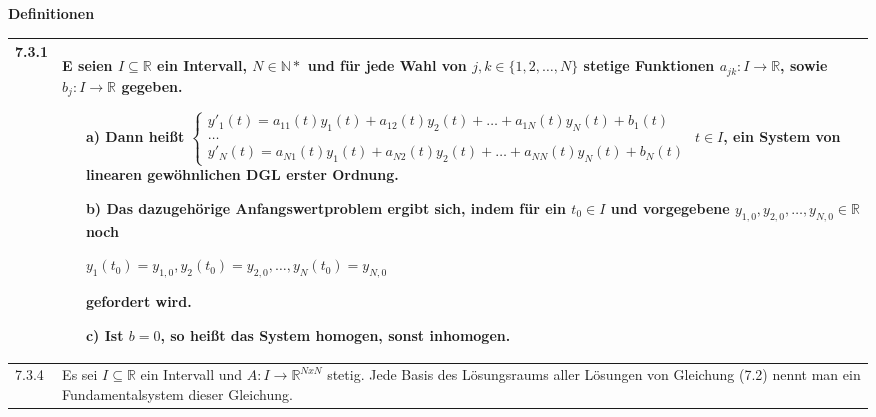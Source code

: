     \noindent
    \textbf{Definitionen}
    \begin{table}[H]  
    \begin{tabularx}{\textwidth}{X m{16cm}}
        \toprule

        7.3.1 & E seien $I \subseteq  \mathbb{R}$ ein Intervall, $N \in \mathbb{N*}$ und für jede Wahl von $j,k \in \{1,2,\dots,N\}$ 
            stetige Funktionen $a_{jk}: I \rightarrow \mathbb{R}$, sowie $b_j: I \rightarrow \mathbb{R}$ gegeben. 
            \begin{itemize}[topsep=-0.5cm]
                \item[a)] Dann heißt \hfill \break
                            $\begin{cases}
                                y'_1(t) = a_{11}(t)y_1(t) + a_{12}(t)y_2(t) + \dots + a_{1N}(t)y_N(t) + b_1(t) \\
                                \dots \\
                                y'_N(t) = a_{N1}(t)y_1(t) + a_{N2}(t) y_2(t) + \dots + a_{NN}(t)y_N(t) + b_N(t)
                            \end{cases}$
                            $t\in I$, ein \textbf{System von linearen gewöhnlichen DGL erster Ordnung.}
                \item[b)] Das dazugehörige Anfangswertproblem ergibt sich, indem für ein $t_0 \in I$ und vorgegebene
                            $y_{1,0},y_{2,0},\dots,y_{N,0} \in \mathbb{R}$ noch \hfill \break
                            \centerline{$ y_1(t_0) = y_{1,0}, y_2(t_0) = y_{2,0}, \dots, y_N(t_0)=y_{N,0} $}
                            gefordert wird.
                \item[c)] Ist $b= 0$, so heißt das System homogen, sonst inhomogen.
            \end{itemize} \vspace{-0cm} \\
        \midrule
        7.3.4 & Es sei $I \subseteq \mathbb{R}$ ein Intervall und $A:I \rightarrow \mathbb{R}^{NxN}$ stetig. Jede Basis des Lösungsraums aller
                Lösungen von Gleichung (7.2) nennt man ein Fundamentalsystem dieser Gleichung. \\

        \bottomrule

    \end{tabularx}
    \end{table}

    \pagebreak

